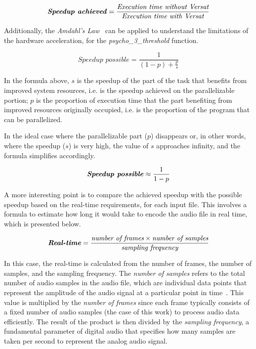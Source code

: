
\begin{equation}
    \textbf{\textit{Speedup achieved}} = \frac{\textit{Execution time without \textit{Versat}}}{\textit{Execution time with \textit{Versat}}} 
\end{equation}

Additionally, the \textit{Amdahl's Law}~\cite{amdahls} can be applied to understand the limitations of the hardware acceleration, for the \textit{psycho\_3\_threshold} function.

\begin{equation}
    \textit{Speedup possible} = \frac{1}{(1 - p) + \frac{p}{s}} 
\end{equation}

In the formula above, $s$ is the speedup of the part of the task that benefits from improved system resources, i.e. is the speedup achieved on the parallelizable portion; $p$ is the proportion of execution time that the part benefiting from improved resources originally occupied, i.e. is the proportion of the program that can be parallelized.

In the ideal case where the parallelizable part ($p$) disappears or, in other words, where the speedup ($s$) is very high, the value of $s$ approaches infinity, and the formula simplifies accordingly.

\begin{equation}
    \textbf{\textit{Speedup possible}} \approx \frac{1}{1 - p}
\end{equation}

A more interesting point is to compare the achieved speedup with the possible speedup based on the real-time requirements, for each input file. 
This involves a formula to estimate how long it would take to encode the audio file in real time, which is presented below.

\begin{equation}
    \textbf{\textit{Real-time}} = \frac{\textit{number of frames} \times \textit{number of samples}}{\textit{sampling frequency}} 
\end{equation}

In this case, the real-time is calculated from the number of frames, the number of samples, and the sampling frequency.
The \textit{number of samples} refers to the total number of audio samples in the audio file, which are individual data points that represent the amplitude of the audio signal at a particular point in time~\cite{twolamefrontend}. This value is multiplied by the \textit{number of frames} since each frame typically consists of a fixed number of audio samples (the case of this work) to process audio data efficiently. The result of the product is then divided by the \textit{sampling frequency}, a fundamental parameter of digital audio that specifies how many samples are taken per second to represent the analog audio signal.

